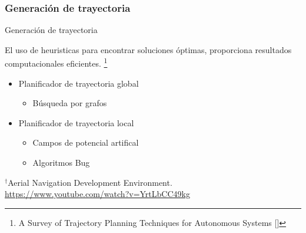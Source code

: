 \documentclass[
  24pt, %
  aspectratio=169, %
]{beamer}
\begin{document}

\subsubsection{Generación de trayectoria}
\begin{frame}{Generación de trayectoria}
  \begin{minipage}{0.47\textwidth}

    El uso de heuristicas para encontrar soluciones óptimas, proporciona resultados computacionales eficientes. \footnote{A Survey of Trajectory Planning Techniques for Autonomous Systems [\cite{Mir2022}]} 
    \bigskip %
    \begin{itemize}
    \item Planificador de trayectoria global
      \begin{itemize}
      \item Búsqueda por grafos
      \end{itemize}
      \bigskip %
    \item Planificador de trayectoria local
      \begin{itemize}
      \item Campos de potencial artifical
      \item Algoritmos Bug
      \end{itemize}
    \end{itemize}
    \bigskip %
  \end{minipage}
  \hspace{0.2cm}
  \begin{minipage}{0.5\textwidth}
    \centering
    \rule{0in}{1.2em}$^\dag$\scriptsize Aerial Navigation Development Environment.\\
    \tiny \url{https://www.youtube.com/watch?v=YrtLbCC49kg} 
  \end{minipage}
  
\end{frame}
\end{document}
